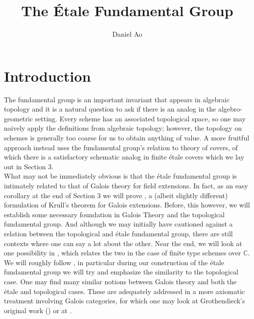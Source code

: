 \documentclass{article}
\theoremstyle{definition}
\theoremstyle{remark}
\newcommand{\C}{\mathbb{C}}
\begin{document}
\title{The \'Etale Fundamental Group}
\author{Daniel Ao}

\maketitle

\tableofcontents

\section{Introduction}

The fundamental group is an important invariant that appears in algebraic topology and it is a natural question to ask if there is an analog in the algebro-geometric setting.
Every scheme has an associated topological space, so one may naively apply the definitions from algebraic topology; however, the topology on schemes is generally too coarse for us to obtain anything of value.
A more fruitful approach instead uses the fundamental group's relation to theory of covers, of which there is a satisfactory schematic analog in finite \'etale covers which we lay out in Section 3.\\

What may not be immediately obvious is that the \'etale fundamental group is intimately related to that of Galois theory for field extensions. 
In fact, as an easy corollary at the end of Section 3 we will prove , a (albeit slightly different) formulation of Krull's theorem for Galois extensions.
Before, this however, we will establish some necessary foundation in Galois Theory and the topological fundamental group. 
And although we may initially have cautioned against a relation between the topological and \'etale fundamental group, there are still contexts where one can say a lot about the other.
Near the end, we will look at one possibility in , which relates the two in the case of finite type schemes over $\C$.\\

\indent We will roughly follow \cite{Szamuely}, in particular during our construction of the \'etale fundamental group we will try and emphasize the similarity to the topological case.
One may find many similar notions between Galois theory and both the \'etale and topological cases.
These are adequately addressed in a more axiomatic treatment involving Galois categories, for which one may look at Grothendieck's original work (\cite{grothendieck}) or at \cite{Lenstra}.
\end{document}
